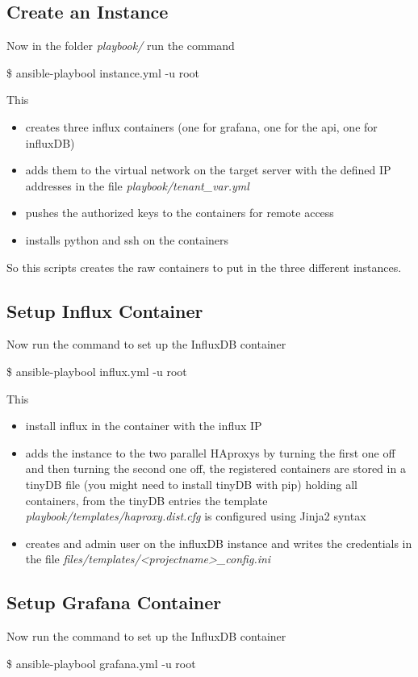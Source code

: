 \subsection{Create an Instance}
Now in the folder \textit{playbook/} run the command
\begin{tcolorbox}
	\$	ansible-playbool instance.yml -u root
\end{tcolorbox}
This 
\begin{itemize}
	\item creates three influx containers (one for grafana, one for the api, one for influxDB)
	\item adds them to the virtual network on the target server with the defined IP addresses in the file \textit{playbook/tenant\_var.yml}
	\item pushes the authorized keys to the containers for remote access
	\item installs python and ssh on the containers
\end{itemize}
So this scripts creates the raw containers to put in the three different instances.

\subsection{Setup Influx Container}
Now run the command to set up the InfluxDB container
\begin{tcolorbox}
	\$	ansible-playbool influx.yml -u root
\end{tcolorbox}

This
\begin{itemize}
	\item install influx in the container with the influx IP
	\item adds the instance to the two parallel HAproxys by turning the first one off and then turning the second one off, the registered containers are stored in a tinyDB file (you might need to install tinyDB with pip) holding all containers, from the tinyDB entries the template \textit{playbook/templates/haproxy.dist.cfg} is configured using Jinja2 syntax
	\item creates and admin user on the influxDB instance and writes the credentials in the file \textit{files/templates/<projectname>\_config.ini}
\end{itemize} 

\subsection{Setup Grafana Container}
Now run the command to set up the InfluxDB container
\begin{tcolorbox}
	\$	ansible-playbool grafana.yml -u root
\end{tcolorbox}

